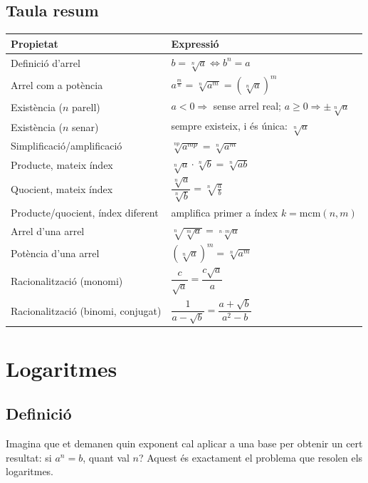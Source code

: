 \subsection{Taula resum}

\begin{center}
\begin{tabular}{ll}
\toprule
\textbf{Propietat} & \textbf{Expressió} \\
\midrule
Definició d'arrel & $b=\sqrt[n]{a} \iff b^n=a$ \\
Arrel com a potència & $a^{\tfrac{m}{n}} = \sqrt[n]{a^m} = \left(\sqrt[n]{a}\right)^m$ \\
Existència ($n$ parell) & $a<0 \Rightarrow$ sense arrel real; $a\ge 0 \Rightarrow \pm\sqrt[n]{a}$ \\
Existència ($n$ senar) & sempre existeix, i és única: $\sqrt[n]{a}$ \\
Simplificació/amplificació & $\sqrt[np]{a^{mp}} = \sqrt[n]{a^{m}}$ \\
Producte, mateix índex & $\sqrt[n]{a}\cdot\sqrt[n]{b} = \sqrt[n]{ab}$ \\
Quocient, mateix índex & $\dfrac{\sqrt[n]{a}}{\sqrt[n]{b}} = \sqrt[n]{\tfrac{a}{b}}$ \\
Producte/quocient, índex diferent & amplifica primer a índex $k=\mathrm{mcm}(n,m)$ \\
Arrel d'una arrel & $\sqrt[n]{\sqrt[m]{a}} = \sqrt[n\cdot m]{a}$ \\
Potència d'una arrel & $\left(\sqrt[n]{a}\right)^m = \sqrt[n]{a^m}$ \\
Racionalització (monomi) & $\dfrac{c}{\sqrt{a}} = \dfrac{c\sqrt{a}}{a}$ \\
Racionalització (binomi, conjugat) & $\dfrac{1}{a-\sqrt{b}} = \dfrac{a+\sqrt{b}}{a^2-b}$ \\
\bottomrule
\end{tabular}
\end{center}

\section{Logaritmes}

\subsection{Definició}

Imagina que et demanen quin exponent cal aplicar a una base per obtenir un cert resultat: si $a^n = b$, quant val $n$? Aquest és exactament el problema que resolen els logaritmes.

